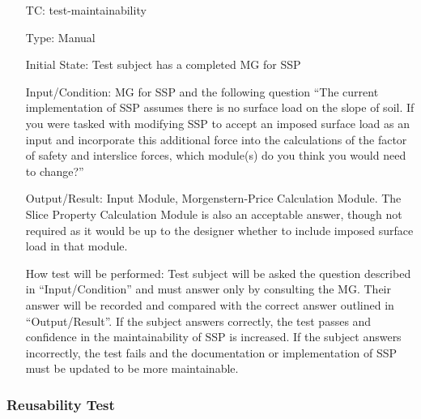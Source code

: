 \documentclass[12pt, titlepage]{article}
\newcounter{testnum} %
\newcommand{\progname}{SSP}
\begin{document}
\begin{enumerate}[label=TC\arabic*:,ref={\arabic*}]
	
\item [TC\refstepcounter{testnum}\thetestnum: \label{TC_Maintainability}] 
test-maintainability

Type: Manual
					
Initial State: Test subject has a completed MG for \progname{}
					
Input/Condition: MG for \progname{} and the following question ``The current 
implementation of \progname{} assumes there is no surface load on the slope of 
soil. If you were tasked with modifying \progname{} to accept an imposed 
surface load as an input and incorporate this additional force into the 
calculations of the factor of safety and interslice forces, which module(s) do 
you think you would need to change?''
					
Output/Result: Input Module, Morgenstern-Price Calculation Module. The Slice 
Property Calculation Module is also an acceptable answer, though not required 
as it would be up to the designer whether to include imposed surface load in 
that module.
					
How test will be performed: Test subject will be asked the question described 
in ``Input/Condition'' and must answer only by consulting the MG. Their answer 
will be recorded and compared with the correct answer outlined in 
``Output/Result''. If the subject answers correctly, the test passes and 
confidence in the maintainability of \progname{} is increased. If the subject 
answers incorrectly, the test fails and the documentation or implementation of 
\progname{} must be updated to be more maintainable.
					
\end{enumerate}


\subsubsection{Reusability Test} \label{sec_Reusability}
\end{document}
